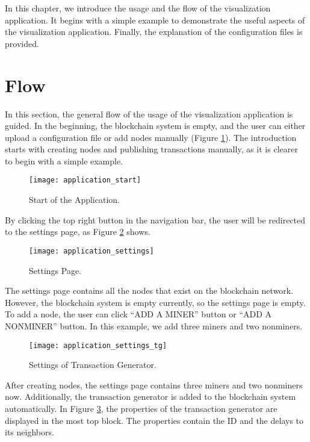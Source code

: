 In this chapter, we introduce the usage and the flow of the visualization application. It begins with a simple example to demonstrate the useful aspects of the visualization application. Finally, the explanation of the configuration files is provided.

\section{Flow}
\label{sec:flow}

In this section, the general flow of the usage of the visualization application is guided. In the beginning, the blockchain system is empty, and the user can either upload a configuration file or add nodes manually (Figure \ref{fig:start of the application}). The introduction starts with creating nodes and publishing transactions manually, as it is clearer to begin with a simple example.

\begin{figure}[htb]
    \centering
    \texttt{[image: application\_start]}
    \caption{Start of the Application.}
    \label{fig:start of the application}
\end{figure}

By clicking the top right button in the navigation bar, the user will be redirected to the settings page, as Figure \ref{fig:settings page} shows.

\begin{figure}[htb]
    \centering
    \texttt{[image: application\_settings]}
    \caption{Settings Page.}
    \label{fig:settings page}
\end{figure}

The settings page contains all the nodes that exist on the blockchain network. However, the blockchain system is empty currently, so the settings page is empty. To add a node, the user can click ``ADD A MINER'' button or ``ADD A NONMINER'' button. In this example, we add three miners and two nonminers.

\begin{figure}[htb]
    \centering
    \texttt{[image: application\_settings\_tg]}
    \caption{Settings of Transaction Generator.}
    \label{fig:settings of transaction generator}
\end{figure}

After creating nodes, the settings page contains three miners and two nonminers now. Additionally, the transaction generator is added to the blockchain system automatically. In Figure \ref{fig:settings of transaction generator}, the properties of the transaction generator are displayed in the most top block. The properties contain the ID and the delays to its neighbors.

